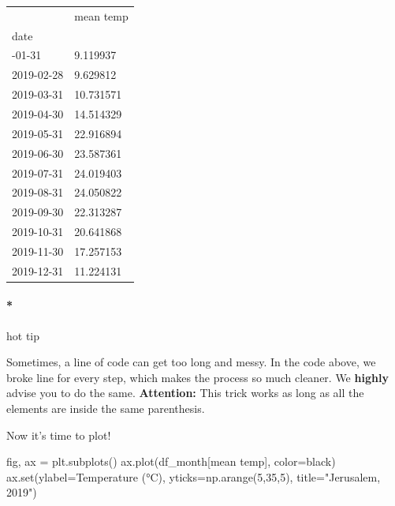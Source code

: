 \documentclass[
  letterpaper,
  DIV=11,
  numbers=noendperiod,
  oneside]{scrreprt}
\let\oldparagraph\paragraph
\renewcommand{\paragraph}[1]{\oldparagraph{#1}\mbox{}}
\newenvironment{Shaded}{\begin{snugshade}}{\end{snugshade}}
\newcommand{\BuiltInTok}[1]{\textcolor[rgb]{0.00,0.23,0.31}{#1}}
\newcommand{\DecValTok}[1]{\textcolor[rgb]{0.68,0.00,0.00}{#1}}
\newcommand{\NormalTok}[1]{\textcolor[rgb]{0.00,0.23,0.31}{#1}}
\newcommand{\OperatorTok}[1]{\textcolor[rgb]{0.37,0.37,0.37}{#1}}
\newcommand{\StringTok}[1]{\textcolor[rgb]{0.13,0.47,0.30}{#1}}
\begin{document}
\begin{longtable}[]{@{}ll@{}}
\toprule\noalign{}
& mean temp \\
date & \\
\midrule\noalign{}
\endhead
\bottomrule\noalign{}
\endlastfoot
2019-01-31 & 9.119937 \\
2019-02-28 & 9.629812 \\
2019-03-31 & 10.731571 \\
2019-04-30 & 14.514329 \\
2019-05-31 & 22.916894 \\
2019-06-30 & 23.587361 \\
2019-07-31 & 24.019403 \\
2019-08-31 & 24.050822 \\
2019-09-30 & 22.313287 \\
2019-10-31 & 20.641868 \\
2019-11-30 & 17.257153 \\
2019-12-31 & 11.224131 \\
\end{longtable}

\hypertarget{hot-tip}{%
\paragraph*{hot tip}\label{hot-tip}}

Sometimes, a line of code can get too long and messy. In the code above,
we broke line for every step, which makes the process so much cleaner.
We \textbf{highly} advise you to do the same. \textbf{Attention:} This
trick works as long as all the elements are inside the same parenthesis.

Now it's time to plot!

\begin{Shaded}
\begin{Highlighting}[]
\NormalTok{fig, ax }\OperatorTok{=}\NormalTok{ plt.subplots()}
\NormalTok{ax.plot(df\_month[}\StringTok{\textquotesingle{}mean temp\textquotesingle{}}\NormalTok{], color}\OperatorTok{=}\StringTok{\textquotesingle{}black\textquotesingle{}}\NormalTok{)}
\NormalTok{ax.}\BuiltInTok{set}\NormalTok{(ylabel}\OperatorTok{=}\StringTok{\textquotesingle{}Temperature (°C)\textquotesingle{}}\NormalTok{,}
\NormalTok{       yticks}\OperatorTok{=}\NormalTok{np.arange(}\DecValTok{5}\NormalTok{,}\DecValTok{35}\NormalTok{,}\DecValTok{5}\NormalTok{),}
\NormalTok{       title}\OperatorTok{=}\StringTok{"Jerusalem, 2019"}\NormalTok{)}
\end{Highlighting}
\end{Shaded}
\end{document}

